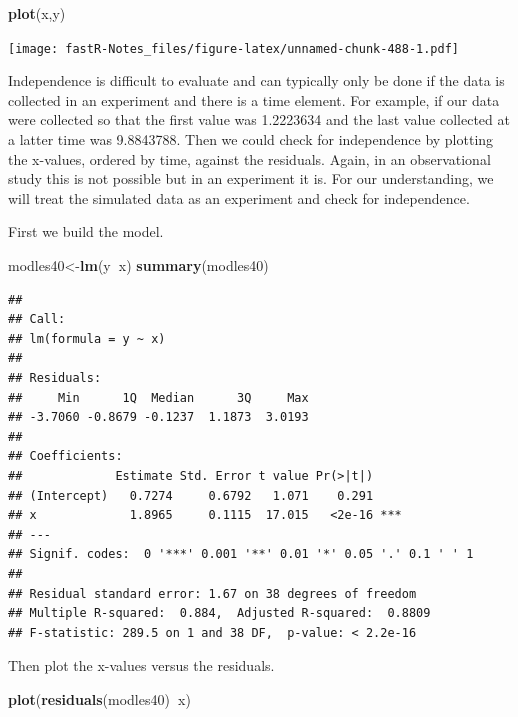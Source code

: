 \documentclass[]{book}
\newenvironment{Shaded}{\begin{snugshade}}{\end{snugshade}}
\newcommand{\KeywordTok}[1]{\textcolor[rgb]{0.13,0.29,0.53}{\textbf{#1}}}
\newcommand{\OperatorTok}[1]{\textcolor[rgb]{0.81,0.36,0.00}{\textbf{#1}}}
\newcommand{\NormalTok}[1]{#1}
\theoremstyle{definition}
\theoremstyle{definition}
\theoremstyle{definition}
\theoremstyle{remark}
\begin{document}
\begin{Shaded}
\begin{Highlighting}[]
\KeywordTok{plot}\NormalTok{(x,y)}
\end{Highlighting}
\end{Shaded}

\texttt{[image: fastR-Notes\_files/figure-latex/unnamed-chunk-488-1.pdf]}

Independence is difficult to evaluate and can typically only be done if
the data is collected in an experiment and there is a time element. For
example, if our data were collected so that the first value was
1.2223634 and the last value collected at a latter time was 9.8843788.
Then we could check for independence by plotting the x-values, ordered
by time, against the residuals. Again, in an observational study this is
not possible but in an experiment it is. For our understanding, we will
treat the simulated data as an experiment and check for independence.

First we build the model.

\begin{Shaded}
\begin{Highlighting}[]
\NormalTok{modles40<-}\KeywordTok{lm}\NormalTok{(y}\OperatorTok{~}\NormalTok{x)}
\KeywordTok{summary}\NormalTok{(modles40)}
\end{Highlighting}
\end{Shaded}

\begin{verbatim}
## 
## Call:
## lm(formula = y ~ x)
## 
## Residuals:
##     Min      1Q  Median      3Q     Max 
## -3.7060 -0.8679 -0.1237  1.1873  3.0193 
## 
## Coefficients:
##             Estimate Std. Error t value Pr(>|t|)    
## (Intercept)   0.7274     0.6792   1.071    0.291    
## x             1.8965     0.1115  17.015   <2e-16 ***
## ---
## Signif. codes:  0 '***' 0.001 '**' 0.01 '*' 0.05 '.' 0.1 ' ' 1
## 
## Residual standard error: 1.67 on 38 degrees of freedom
## Multiple R-squared:  0.884,  Adjusted R-squared:  0.8809 
## F-statistic: 289.5 on 1 and 38 DF,  p-value: < 2.2e-16
\end{verbatim}

Then plot the x-values versus the residuals.

\begin{Shaded}
\begin{Highlighting}[]
\KeywordTok{plot}\NormalTok{(}\KeywordTok{residuals}\NormalTok{(modles40)}\OperatorTok{~}\NormalTok{x)}
\end{Highlighting}
\end{Shaded}
\end{document}
